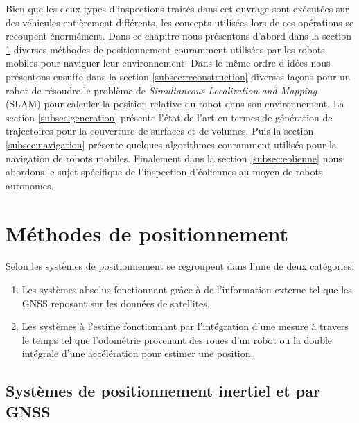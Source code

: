 \label{sec:RevLitt}

Bien que les deux types d'inspections traités dans cet ouvrage sont exécutées sur des véhicules entièrement différents, les concepts utilisées lors de ces opérations se recoupent énormément. Dans ce chapitre nous présentons d'abord dans la section \ref{subsec:positionnement} diverses méthodes de positionnement couramment utilisées par les robots mobiles pour naviguer leur environnement. Dans le même ordre d'idées nous présentons ensuite dans la section \ref{subsec:reconstruction} diverses façons pour un robot de résoudre le problème de \textit{Simultaneous Localization and Mapping} (SLAM) pour calculer la position relative du robot dans son environnement. La section \ref{subsec:generation} présente l'état de l'art en termes de génération de trajectoires pour la couverture de surfaces et de volumes. Puis la section \ref{subsec:navigation} présente quelques algorithmes couramment utilisés pour la navigation de robots mobiles. Finalement dans la section \ref{subsec:eolienne} nous abordons le sujet spécifique de l'inspection d'éoliennes au moyen de robots autonomes.

\section{Méthodes de positionnement}\label{subsec:positionnement}

Selon \citep{Borenstein1997} les systèmes de positionnement se regroupent dans l'une de deux catégories:

\begin{enumerate}
  \item Les systèmes absolus fonctionnant grâce à de l'information externe tel que les GNSS reposant sur les données de satellites.
  \item Les systèmes à l'estime fonctionnant par l'intégration d'une mesure à travers le temps tel que l'odométrie provenant des roues d'un robot ou la double intégrale d'une accélération pour estimer une position.
\end{enumerate}

\subsection{Systèmes de positionnement inertiel et par GNSS}

